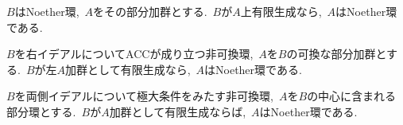 \begin{cor}[Eakin-永田,1968]
	$B$はNoether環,~$A$をその部分加群とする.~$B$が$A$上有限生成なら,~$A$はNoether環である.
\end{cor}
\begin{cor}
	\begin{sakura}
		\item $B$を右イデアルについてACCが成り立つ非可換環,~$A$を$B$の可換な部分加群とする.~$B$が左$A$加群として有限生成なら,~$A$はNoether環である.
		\item $B$を両側イデアルについて極大条件をみたす非可換環,~$A$を$B$の中心に含まれる部分環とする.~$B$が$A$加群として有限生成ならば,~$A$はNoether環である.
	\end{sakura}
\end{cor}
